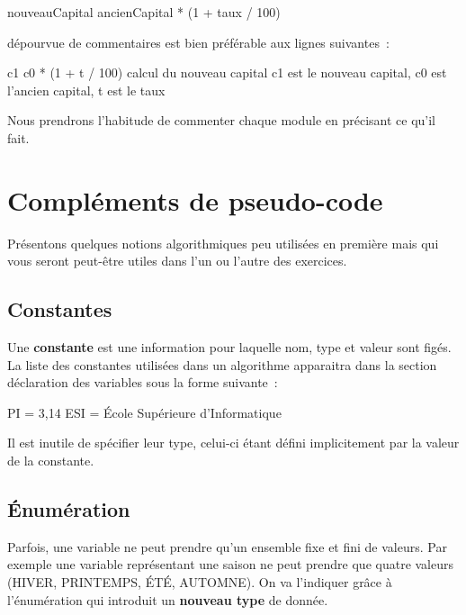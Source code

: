 		\begin{Pseudocode}
		\Let nouveauCapital \Gets ancienCapital * (1 + taux / 100)
		\end{Pseudocode}

		dépourvue de commentaires est bien préférable aux lignes suivantes~:

		\begin{Pseudocode}
		\Let c1 \Gets c0 * (1 + t / 100) \RComment calcul du nouveau capital
		\Empty \RComment c1 est le nouveau capital, c0 est l’ancien capital, t est le taux
		\end{Pseudocode}
		
		Nous prendrons l’habitude de commenter chaque module en précisant ce qu’il fait.

	\section{Compléments de pseudo-code}

		Présentons quelques notions algorithmiques peu
		utilisées en première mais qui vous seront peut-être utiles dans
		l’un ou l’autre des exercices.

		\subsection{Constantes}

			Une \textbf{constante} est une information pour laquelle nom, type et
			valeur sont figés. La liste des constantes utilisées dans un algorithme
			apparaitra dans la section déclaration des variables sous la forme
			suivante~:

			\begin{Pseudocode}
			\Stmt {} PI = 3,14
			\Stmt \K{constante} ESI 
				= {\textquotedbl}École Supérieure d’Informatique{\textquotedbl}
			\end{Pseudocode}

			Il est inutile de spécifier leur type, celui-ci
			étant défini implicitement par la valeur de la constante.

		\subsection{Énumération}

			Parfois, une variable ne peut prendre qu’un ensemble
			fixe et fini de valeurs. Par exemple une variable représentant une
			saison ne peut prendre que quatre valeurs (HIVER, PRINTEMPS, ÉTÉ,
			AUTOMNE). On va l’indiquer grâce à
			l’énumération qui introduit un \textbf{nouveau type}
			de donnée.

